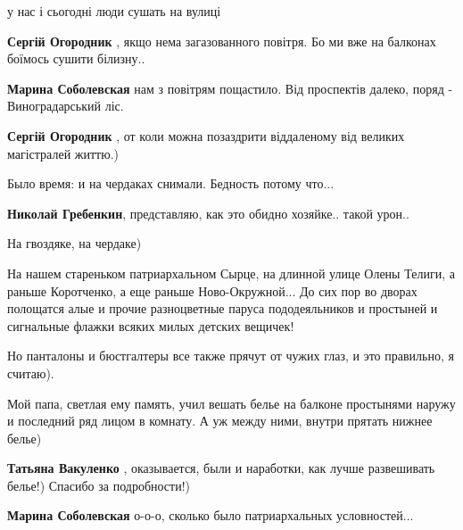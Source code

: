  
 
 
 
 
\zzSecCmt

\begin{itemize} %
у нас і сьогодні люди сушать на вулиці

\begin{itemize} %
\textbf{Сергій Огородник} , якщо нема загазованного повітря. Бо ми вже на балконах боїмось сушити білизну..

\textbf{Марина Соболевская} нам з повітрям пощастило. Від проспектів далеко, поряд - Виноградарський ліс.

\textbf{Сергій Огородник} , от коли можна позаздрити віддаленому від великих магістралей життю.)
\end{itemize} %

Было время: и на чердаках снимали. Бедность потому что...

\textbf{Николай Гребенкин}, представляю, как это обидно хозяйке.. такой урон..


На гвоздяке, на чердаке)

На нашем стареньком патриархальном Сырце, на длинной улице Олены Телиги, а раньше
Коротченко, а еще раньше Ново-Окружной... До сих пор во дворах полощатся алые и
прочие разноцветные паруса пододеяльников и простыней и сигнальные флажки
всяких милых детских вещичек!

Но панталоны и бюстгалтеры все также прячут от чужих глаз, и это правильно, я считаю).

Мой папа, светлая ему память, учил вешать белье на балконе простынями наружу и
последний ряд лицом в комнату. А уж между ними, внутри прятать нижнее белье)

\begin{itemize} %
\textbf{Татьяна Вакуленко} , оказывается, были и наработки, как лучше развешивать белье!) Спасибо за подробности!)

\textbf{Марина Соболевская} о-о-о, сколько было патриархальных условностей...


\end{itemize}
\end{itemize}
